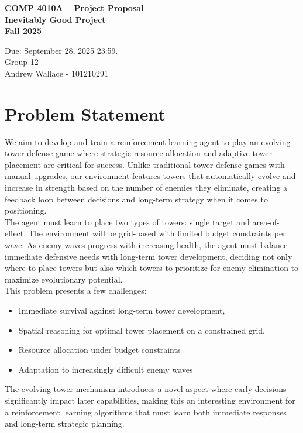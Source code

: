 \documentclass[12pt]{article}
\begin{document}
 

\begin{center} \Large\bf
COMP 4010A -- Project Proposal\\
Inevitably Good Project \\
Fall 2025
\end{center} 

\begin{center}
Due: September 28, 2025 23:59. \\
Group 12 \\
Andrew Wallace - 101210291\\
\end{center}

\section{Problem Statement}
We aim to develop and train a reinforcement learning agent to play an evolving tower defense game where strategic resource allocation and adaptive tower placement are critical for success. Unlike traditional tower defense games with manual upgrades, our environment features towers that automatically evolve and increase in strength based on the number of enemies they eliminate, creating a feedback loop between decisions and long-term strategy when it comes to positioning.\\

The agent must learn to place two types of towers: single target and area-of-effect. The environment will be grid-based with limited budget constraints per wave. As enemy waves progress with increasing health, the agent must balance immediate defensive needs with long-term tower development, deciding not only where to place towers but also which towers to prioritize for enemy elimination to maximize evolutionary potential.\\

This problem presents a few challenges: 
\begin{itemize}
    \item Immediate survival against long-term tower development,
    \item Spatial reasoning for optimal tower placement on a constrained grid,
    \item Resource allocation under budget constraints
    \item Adaptation to increasingly difficult enemy waves
\end{itemize}
The evolving tower mechanism introduces a novel aspect where early decisions significantly impact later capabilities, making this an interesting environment for a reinforcement learning algorithms that must learn both immediate responses and long-term strategic planning.
\end{document}
